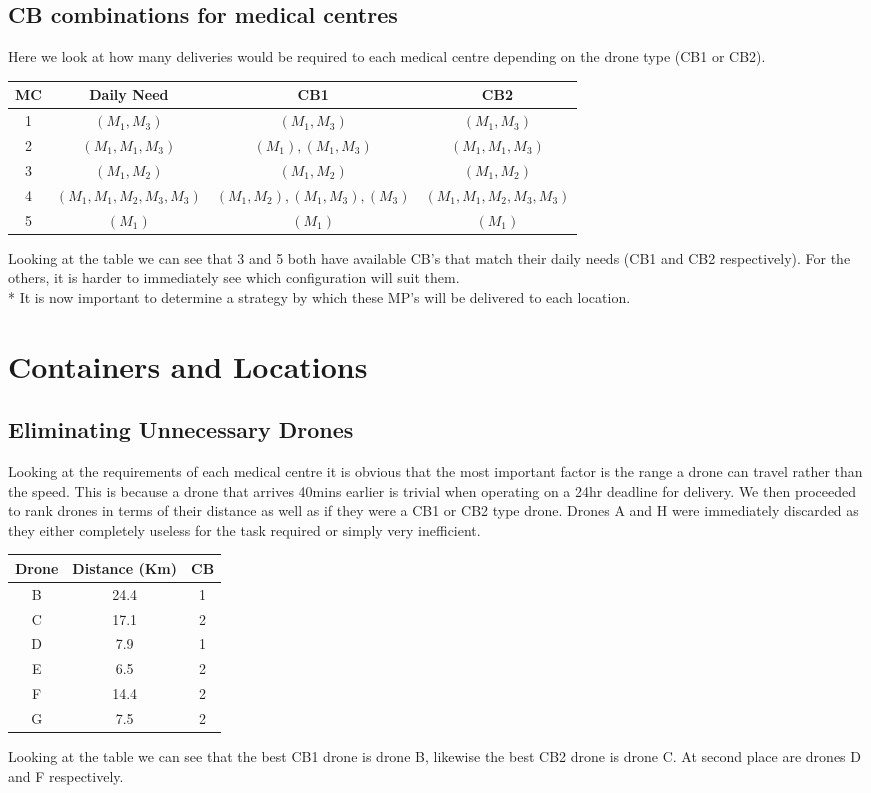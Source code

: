 \documentclass[a4paper,12pt]{article}
\begin{document}
\subsection{CB combinations for medical centres}
Here we look at how many deliveries would be required to each medical centre depending on the drone type (CB1 or CB2).
\begin{center}
\begin{tabular}{ |c|c|c|c| }
 \hline
 MC & Daily Need & CB1 & CB2 \\\hline
  1 & $(M_1,M_3)$ & $(M_1,M_3)$ & $(M_1,M_3)$  \\
  2 & $(M_1,M_1,M_3)$ & $(M_1),(M_1,M_3)$ & $(M_1,M_1,M_3)$  \\
  3 & $(M_1,M_2)$ & $(M_1,M_2)$ & $ (M_1,M_2)$  \\
  4 & $(M_1,M_1,M_2,M_3,M_3)$ & $(M_1,M_2),(M_1,M_3),(M_3)$ & $(M_1,M_1,M_2,M_3,M_3)$  \\
  5 & $(M_1)$ & $(M_1)$ & $(M_1)$  \\
\hline
\end{tabular}
\end{center}
Looking at the table we can see that 3 and 5 both have available CB's that match their daily needs (CB1 and CB2 respectively).
For the others, it is harder to immediately see which configuration will suit them.\\*
It is now important to determine a strategy by which these MP's will be delivered to each location.

\newpage

\section{Containers and Locations}
\subsection{Eliminating Unnecessary Drones}
Looking at the requirements of each medical centre it is obvious that the most important factor is the range a drone can travel rather than the speed.
This is because a drone that arrives 40mins earlier is trivial when operating on a 24hr deadline for delivery.
We then proceeded to rank drones in terms of their distance as well as if they were a CB1 or CB2 type drone.
Drones A and H were immediately discarded as they either completely useless for the task required or simply very inefficient.

\begin{center}
\begin{tabular}{ |c|c|c| }
 \hline
 Drone & Distance (Km) & CB \\\hline
  B & 24.4 & 1 \\
  C & 17.1 & 2  \\
  D & 7.9 & 1 \\
  E & 6.5 & 2 \\
  F & 14.4 & 2 \\
  G & 7.5 & 2 \\
 \hline
\end{tabular}
\end{center}
Looking at the table we can see that the best CB1 drone is drone B, likewise the best CB2 drone is drone C. At second place are drones D and F respectively.
\end{document}
